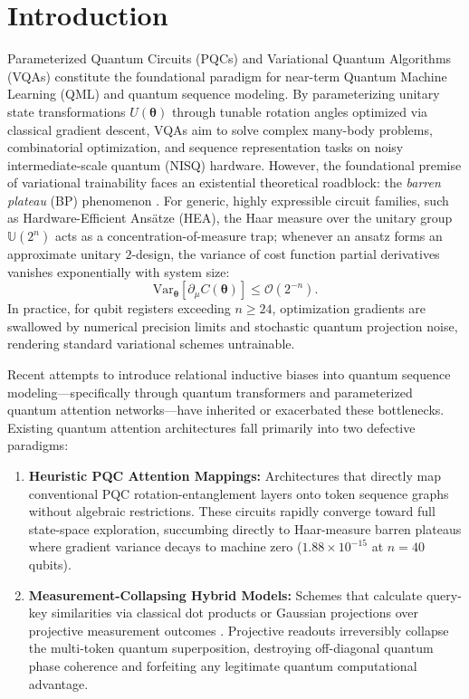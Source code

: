 \documentclass{article}
\begin{document}
\section{Introduction}
\label{sec:intro}

Parameterized Quantum Circuits (PQCs) and Variational Quantum Algorithms (VQAs) constitute the foundational paradigm for near-term Quantum Machine Learning (QML) and quantum sequence modeling. By parameterizing unitary state transformations $U(\boldsymbol{\theta})$ through tunable rotation angles optimized via classical gradient descent, VQAs aim to solve complex many-body problems, combinatorial optimization, and sequence representation tasks on noisy intermediate-scale quantum (NISQ) hardware. However, the foundational premise of variational trainability faces an existential theoretical roadblock: the \emph{barren plateau} (BP) phenomenon \citep{Larocca2024BarrenPlateaus}. For generic, highly expressible circuit families, such as Hardware-Efficient Ans\"atze (HEA), the Haar measure over the unitary group $\mathbb{U}(2^n)$ acts as a concentration-of-measure trap; whenever an ansatz forms an approximate unitary $2$-design, the variance of cost function partial derivatives vanishes exponentially with system size:
\begin{equation}
\mathrm{Var}_{\boldsymbol{\theta}}[\partial_\mu C(\boldsymbol{\theta})] \le \mathcal{O}(2^{-n}).
\label{eq:bp_variance}
\end{equation}
In practice, for qubit registers exceeding $n \ge 24$, optimization gradients are swallowed by numerical precision limits and stochastic quantum projection noise, rendering standard variational schemes untrainable.

Recent attempts to introduce relational inductive biases into quantum sequence modeling—specifically through quantum transformers and parameterized quantum attention networks—have inherited or exacerbated these bottlenecks. Existing quantum attention architectures fall primarily into two defective paradigms:
\begin{enumerate}
    \item \textbf{Heuristic PQC Attention Mappings:} Architectures that directly map conventional PQC rotation-entanglement layers onto token sequence graphs without algebraic restrictions. These circuits rapidly converge toward full state-space exploration, succumbing directly to Haar-measure barren plateaus where gradient variance decays to machine zero ($1.88 \times 10^{-15}$ at $n=40$ qubits).
    \item \textbf{Measurement-Collapsing Hybrid Models:} Schemes that calculate query-key similarities via classical dot products or Gaussian projections over projective measurement outcomes \citep{Li2022QuantumSelfattention}. Projective readouts irreversibly collapse the multi-token quantum superposition, destroying off-diagonal quantum phase coherence and forfeiting any legitimate quantum computational advantage.
\end{enumerate}
\end{document}

